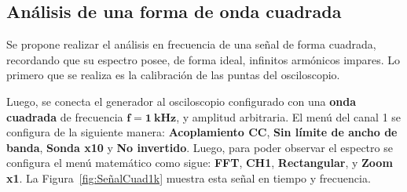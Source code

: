   \subsection{Análisis de una forma de onda cuadrada}
    Se propone realizar el análisis en frecuencia de una señal de forma cuadrada, recordando que
    su espectro posee, de forma ideal, infinitos armónicos impares. Lo primero que se realiza es 
    la calibración de las puntas del osciloscopio.

    Luego, se conecta el generador al osciloscopio configurado con una \textbf{onda cuadrada} de
    frecuencia $\mathbf{f=1~kHz}$, y amplitud arbitraria. El menú del canal 1 se configura de la
    siguiente manera: \textbf{Acoplamiento CC}, \textbf{Sin límite de ancho de banda},
    \textbf{Sonda x10} y \textbf{No invertido}. Luego, para poder observar el espectro se
    configura el menú matemático como sigue: \textbf{FFT}, \textbf{CH1}, \textbf{Rectangular},
    y \textbf{Zoom x1}. La Figura~\ref{fig:SeñalCuad1k} muestra esta señal en tiempo y frecuencia.

